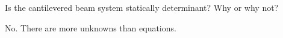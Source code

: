 Is the cantilevered beam system statically determinant? Why or why not?

\begin{solution}
    No. There are more unknowns than equations.
\end{solution}